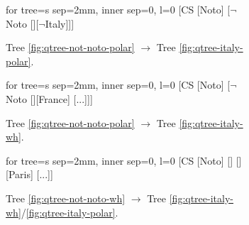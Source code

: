 \begin{figure}[H]
\centering
\setlength{\fboxsep}{1pt}
\renewcommand\thefigure{\ref{fig:qtrees-if-not-noto-italy}}
\begin{subfigure}[b]{.22\linewidth}
	\centering
	\scalebox{.7}
	{\begin{forest}for tree={s sep=2mm, inner sep=0, l=0}
			[CS [{Noto}] [{$\neg$Noto} [][$\neg$Italy]]]
	\end{forest}}
	\caption{Tree \ref{fig:qtree-not-noto-polar} $\rightarrow$ Tree \ref{fig:qtree-italy-polar}.}\label{fig:tree-hc-sw-polar-polar-2}
\end{subfigure}\hfill
\begin{subfigure}[b]{.22\linewidth}
	\centering
	\scalebox{.7}
	{\begin{forest}for tree={s sep=2mm, inner sep=0, l=0}
			[CS [{Noto}] [{$\neg$Noto} [][France] [...]]]
	\end{forest}}
	\caption{Tree \ref{fig:qtree-not-noto-polar} $\rightarrow$ Tree \ref{fig:qtree-italy-wh}.}\label{fig:tree-hc-sw-polar-wh-2}
\end{subfigure}\hfill
\begin{subfigure}[b]{.3\linewidth}
	\centering
	\scalebox{.7}
	{\begin{forest}for tree={s sep=2mm, inner sep=0, l=0}
			[CS [{Noto}] [] [] [{Paris}] [...]]
	\end{forest}}
	\caption{Tree \ref{fig:qtree-not-noto-wh} $\rightarrow$ Tree \ref{fig:qtree-italy-wh}/\ref{fig:qtree-italy-polar}.}\label{fig:qtree-if-not-noto-italy-wh-wh-2}\label{fig:tree-hc-sw-wh-2}
\end{subfigure}\hfill
\begin{subfigure}[b]{.25\linewidth}

\end{subfigure}
\end{figure}
